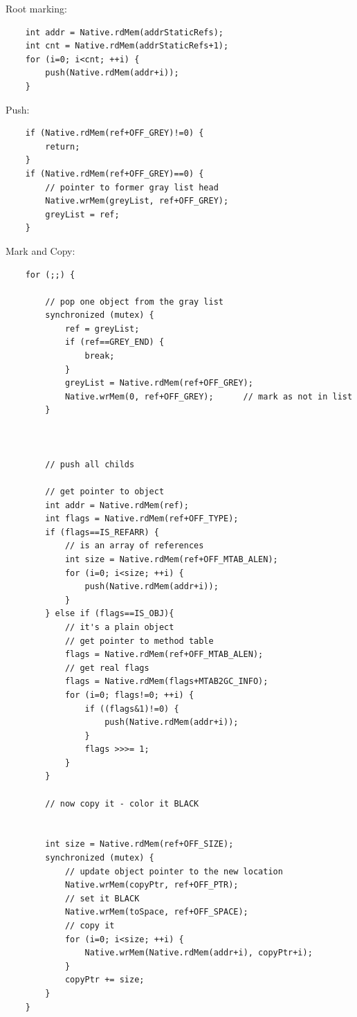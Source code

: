 Root marking:
\begin{verbatim}
    int addr = Native.rdMem(addrStaticRefs);
    int cnt = Native.rdMem(addrStaticRefs+1);
    for (i=0; i<cnt; ++i) {
        push(Native.rdMem(addr+i));
    }
\end{verbatim}

Push:
\begin{verbatim}
    if (Native.rdMem(ref+OFF_GREY)!=0) {
        return;
    }
    if (Native.rdMem(ref+OFF_GREY)==0) {
        // pointer to former gray list head
        Native.wrMem(greyList, ref+OFF_GREY);
        greyList = ref;
    }
\end{verbatim}

Mark and Copy:
\begin{verbatim}
    for (;;) {

        // pop one object from the gray list
        synchronized (mutex) {
            ref = greyList;
            if (ref==GREY_END) {
                break;
            }
            greyList = Native.rdMem(ref+OFF_GREY);
            Native.wrMem(0, ref+OFF_GREY);      // mark as not in list
        }



        // push all childs

        // get pointer to object
        int addr = Native.rdMem(ref);
        int flags = Native.rdMem(ref+OFF_TYPE);
        if (flags==IS_REFARR) {
            // is an array of references
            int size = Native.rdMem(ref+OFF_MTAB_ALEN);
            for (i=0; i<size; ++i) {
                push(Native.rdMem(addr+i));
            }
        } else if (flags==IS_OBJ){
            // it's a plain object
            // get pointer to method table
            flags = Native.rdMem(ref+OFF_MTAB_ALEN);
            // get real flags
            flags = Native.rdMem(flags+MTAB2GC_INFO);
            for (i=0; flags!=0; ++i) {
                if ((flags&1)!=0) {
                    push(Native.rdMem(addr+i));
                }
                flags >>>= 1;
            }
        }

        // now copy it - color it BLACK


        int size = Native.rdMem(ref+OFF_SIZE);
        synchronized (mutex) {
            // update object pointer to the new location
            Native.wrMem(copyPtr, ref+OFF_PTR);
            // set it BLACK
            Native.wrMem(toSpace, ref+OFF_SPACE);
            // copy it
            for (i=0; i<size; ++i) {
                Native.wrMem(Native.rdMem(addr+i), copyPtr+i);
            }
            copyPtr += size;
        }
    }
\end{verbatim}

